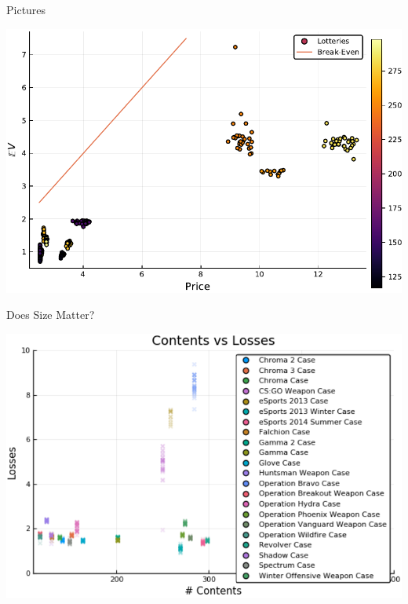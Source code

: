 \documentclass[presentation]{beamer}
\begin{document}
\begin{frame}[label={sec:orgaa7c744}]{Pictures}
\begin{center}
\includegraphics[width=.9\linewidth]{../Plots/BreakEvenScatter.pdf}
\end{center}
\end{frame}

\begin{frame}[label={sec:orgcdc6371}]{Does Size Matter?}
\begin{center}
\includegraphics[width=.9\linewidth]{../Plots/LossesVSize.pdf}
\end{center}
\end{frame}
\end{document}
